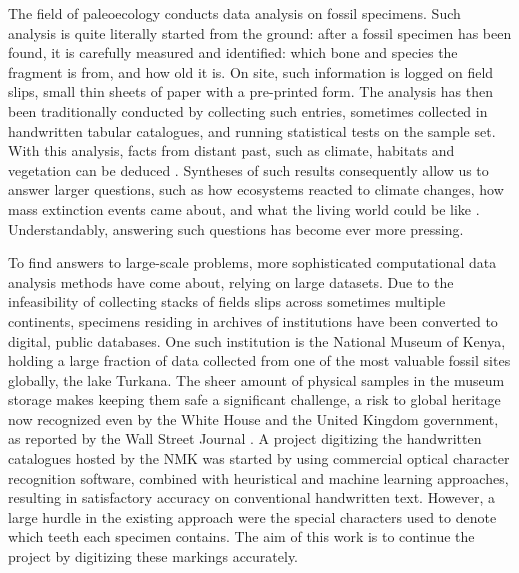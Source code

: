 \documentclass{article}
\begin{document}
The field of paleoecology conducts data analysis on fossil specimens.
Such analysis is quite literally started from the ground: after a fossil specimen has been found, it is 
carefully measured and identified: which bone and species the fragment is from, and how old it is. On site, such information is logged on field slips, small thin sheets of 
paper with a pre-printed form. The analysis has then been traditionally conducted by 
collecting such entries, sometimes collected in handwritten tabular catalogues, and running statistical 
tests on the sample set. With this analysis, facts from distant past, such as climate, habitats and 
vegetation can be deduced \cite{Faith_Lyman_2019}. Syntheses of such results consequently allow us to 
answer larger questions, such as how ecosystems reacted to climate changes, how mass extinction events 
came about, and what the living world could be like \cite{Žliobaitė2023}. Understandably, answering such 
questions has become ever more pressing.


To find answers to large-scale problems, more sophisticated computational data analysis methods have come about,
relying on large datasets. Due to the infeasibility of collecting stacks of fields slips across sometimes multiple 
continents, specimens residing in archives of institutions have been converted to digital, public databases.
One such institution is the National Museum of Kenya, holding a large fraction of data collected from one 
of the most valuable fossil sites globally, the lake Turkana. The sheer amount of physical samples in the museum storage
makes keeping them safe a significant challenge, a risk to global heritage now recognized even by the White House and 
the United Kingdom government, as reported by the Wall Street Journal \cite{hotzMuseumOverflowingPrehistoric2024}.
 A project digitizing the handwritten catalogues hosted by the NMK was started by
using commercial optical character recognition software, combined with heuristical and machine learning approaches, 
resulting in satisfactory accuracy on conventional handwritten text. However, a large hurdle in the existing 
approach were the special characters used to denote which teeth each specimen contains. The aim of this work is 
to continue the project by digitizing these markings accurately.
\end{document}
